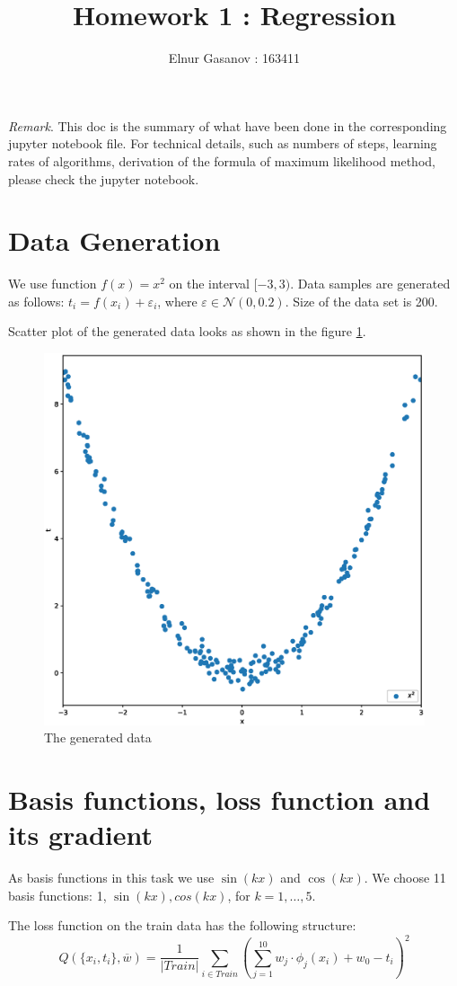 \documentclass{article}
\title{Homework 1 : Regression}
\author{Elnur Gasanov : 163411}
\begin{document}
\maketitle

\textit{Remark}. This doc is the summary of what have been done in the corresponding jupyter notebook file. For technical details, such as numbers of steps, learning rates of algorithms, derivation of the formula of maximum likelihood method, please check the jupyter notebook.

\section{Data Generation}

We use function $f(x) = x^2$ on the interval $[-3, 3)$. Data samples are generated as follows: $t_i = f(x_i) + \varepsilon_i$, where $\varepsilon \in \mathcal{N}(0, 0.2)$. Size of the data set is 200.

Scatter plot of the generated data looks as shown in the figure \ref{GenData}.

\begin{figure}
	\centering
	\includegraphics[width = 0.5\linewidth]{raw_data}
	\caption{The generated data}
	\label{GenData}
\end{figure}

\section{Basis functions, loss function and its gradient}

As basis functions in this task we use $\sin(kx)$ and $\cos(kx)$. We choose 11 basis functions: 
1, $\sin(kx), cos(kx)$, for $k = 1, \dots, 5$.

The loss function on the train data has the following structure:
$$
Q(\{x_i, t_i\}, \overline{w}) = \frac{1}{|Train|}\sum\limits_{i \in Train} (\sum\limits_{j = 1}^{10} w_j \cdot \phi_j(x_i) + w_0 - t_i)^2
$$
\end{document}
